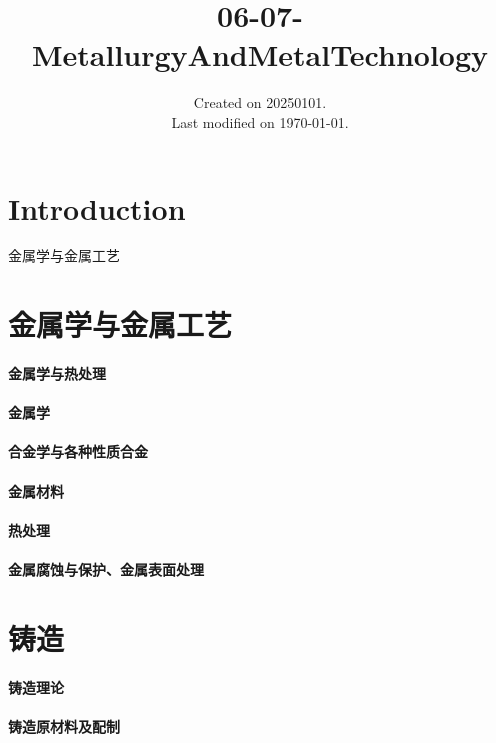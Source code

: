 \documentclass[UTF8]{../../ApplicationUniverse}
\begin{document}
\title{06-07-MetallurgyAndMetalTechnology}
\date{Created on 20250101.\\   Last modified on \today.}
\maketitle
\tableofcontents


\chapter{Introduction}


金属学与金属工艺



\chapter{金属学与金属工艺}
\subsubsection{金属学与热处理}
\subsubsection{金属学}
\subsubsection{合金学与各种性质合金}
\subsubsection{金属材料}
\subsubsection{热处理}
\subsubsection{金属腐蚀与保护、金属表面处理}






\chapter{铸造}
\subsubsection{铸造理论}
\subsubsection{铸造原材料及配制}
\end{document}
